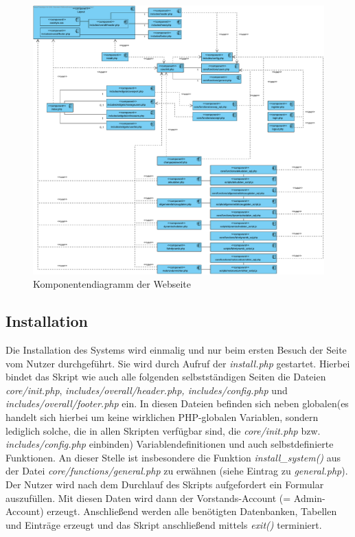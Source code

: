 \documentclass[fontsize = 12pt, paper = a4]{scrreprt}
\begin{document}
\begin{figure}[h]
\centering
\includegraphics[scale = 0.4]{webseite}
\caption[Komponentendiagramm der Webseite]{Komponentendiagramm der Webseite}
\label{aufbau}
\end{figure}


\subsection{Installation}
Die Installation des Systems wird einmalig und nur beim ersten Besuch der Seite vom Nutzer durchgeführt. Sie wird durch Aufruf der \textit{install.php} gestartet. Hierbei bindet das Skript wie auch alle folgenden selbstständigen Seiten die Dateien \textit{core/init.php}, \textit{includes/overall/header.php, includes/config.php} und \textit{includes/overall/footer.php} ein. In diesen Dateien befinden sich neben \glqq globalen\grqq (es handelt sich hierbei um keine wirklichen PHP-globalen Variablen, sondern lediglich solche, die in allen Skripten verfügbar sind, die \textit{core/init.php} bzw. \textit{includes/config.php} einbinden) Variablendefinitionen und auch selbstdefinierte Funktionen. An dieser Stelle ist insbesondere die Funktion \textit{install\_system()} aus der Datei \textit{core/functions/general.php} zu erwähnen (siehe Eintrag zu \textit{general.php}).\\
Der Nutzer wird nach dem Durchlauf des Skripts aufgefordert ein Formular auszufüllen. Mit diesen Daten wird dann der Vorstands-Account (= Admin-Account) erzeugt. Anschließend werden alle benötigten Datenbanken, Tabellen und Einträge erzeugt und das Skript anschließend mittels \textit{exit()} terminiert.
\end{document}
